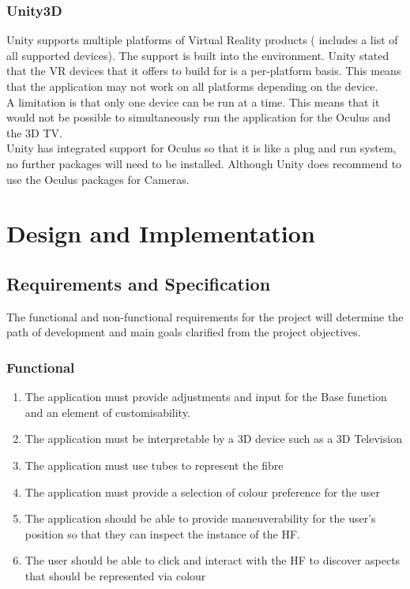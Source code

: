 \documentclass[12pt]{article} %
\begin{document}
\begin{flushleft}
\subsubsection{Unity3D}
Unity supports multiple platforms of Virtual Reality products (\cite{unity:manualvr} includes a list of all supported devices). The support is built into the environment. Unity stated that the VR devices that it offers to build for is a per-platform basis. This means that the application may not work on all platforms depending on the device.\\
A limitation is that only one device can be run at a time. This means that it would not be possible to simultaneously run the application for the Oculus and the 3D TV.\\
Unity has integrated support for Oculus so that it is like a plug and run system, no further packages will need to be installed. Although Unity does recommend to use the Oculus packages for Cameras.

\section{Design and Implementation}
\subsection{Requirements and Specification} %
The functional and non-functional requirements for the project will determine the path of development and main goals clarified from the project objectives.\\
\subsubsection{Functional} %
\begin{enumerate}
\item The application must provide adjustments and input for the Base function and an element of customisability. 
\item The application must be interpretable by a 3D device such as a 3D Television
\item The application must use tubes to represent the fibre 
\item The application must provide a selection of colour preference for the user
\item The application should be able to provide maneuverability for the user’s position so that they can inspect the instance of the HF.
\item The user should be able to click and interact with the HF to discover aspects that should be represented via colour 
\end{enumerate}

\end{flushleft}
\end{document}
